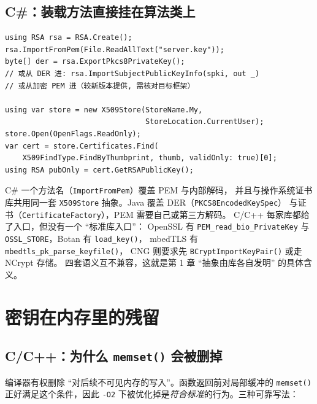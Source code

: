 \documentclass[12pt,a4paper,fontset=fandol]{ctexbook}
\newcommand{\Fn}[1]{\texttt{#1()}}
\newcommand{\Tp}[1]{\texttt{#1}}
\newcommand{\CSharp}{C\#}
\newcommand{\CppJava}{C/C++}
\begin{document}
\subsection{\CSharp{}：装载方法直接挂在算法类上}

\begin{lstlisting}[style=csharpstyle,caption={C\#：PEM、DER 与证书库三种入口}]
using RSA rsa = RSA.Create();
rsa.ImportFromPem(File.ReadAllText("server.key"));
byte[] der = rsa.ExportPkcs8PrivateKey();
// 或从 DER 进: rsa.ImportSubjectPublicKeyInfo(spki, out _)
// 或从加密 PEM 进（较新版本提供, 需核对目标框架）

using var store = new X509Store(StoreName.My,
                                StoreLocation.CurrentUser);
store.Open(OpenFlags.ReadOnly);
var cert = store.Certificates.Find(
    X509FindType.FindByThumbprint, thumb, validOnly: true)[0];
using RSA pubOnly = cert.GetRSAPublicKey();
\end{lstlisting}

\begin{compare}[title=``装载一把私钥'' 的三语言成本]
\CSharp{} 一个方法名（\Tp{ImportFromPem}）覆盖 PEM 与内部解码，
并且与操作系统证书库共用同一套
\Tp{X509Store} 抽象。Java 覆盖 DER（\Tp{PKCS8EncodedKeySpec}）
与证书（\Tp{CertificateFactory}），PEM 需要自己或第三方解码。
\CppJava{} 每家库都给了入口，但没有一个 ``标准库入口''：
OpenSSL 有 \Tp{PEM\_\allowbreak read\_\allowbreak bio\_\allowbreak PrivateKey}
与 \Tp{OSSL\_STORE}，Botan 有 \Fn{load\_key}，
mbedTLS 有 \Fn{mbedtls\_pk\_parse\_\allowbreak keyfile}，
CNG 则要求先 \Fn{BCryptImportKeyPair} 或走 NCrypt 存储。
四套语义互不兼容，这就是第 1 章 ``抽象由库各自发明'' 的具体含义。
\end{compare}

\section{密钥在内存里的残留}

\subsection{\CppJava{}：为什么 \Fn{memset} 会被删掉}

编译器有权删除 ``对后续不可见内存的写入''。函数返回前对局部缓冲的
\Fn{memset} 正好满足这个条件，因此
\texttt{-O2} 下被优化掉是\emph{符合标准}的行为。三种可靠写法：
\end{document}
